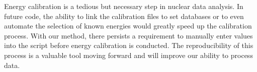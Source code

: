 Energy calibration is a tedious but necessary step in nuclear data analysis. In future code,
the ability to link the calibration files to set databases or to even automate the selection of known energies
would greatly speed up the calibration process.  With our method, there persists a requirement to manually
enter values into the script before energy calibration is conducted. The reproducibility of this process is a valuable
tool moving forward and will improve our ability to process data.  
